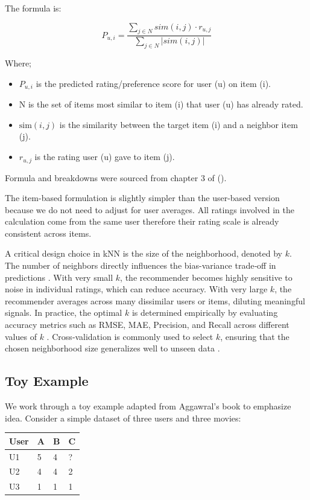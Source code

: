 \documentclass[
  12pt]{article}
\begin{document}
The formula is:

\[
P_{u,i} = \frac{\sum_{j \in N} sim(i,j) \cdot r_{u,j}}{\sum_{j \in N} |sim(i,j)|}
\]

Where;

\begin{itemize}
\item
  \(P_{u,i}\) is the predicted rating/preference score for user (u) on
  item (i).
\item
  N is the set of items most similar to item (i) that user (u) has
  already rated.
\item
  \(\text{sim}(i,j)\) is the similarity between the target item (i) and
  a neighbor item (j).
\item
  \(r_{u,j}\) is the rating user (u) gave to item (j).
\end{itemize}

Formula and breakdowns were sourced from chapter 3 of
(\citet{apxml2025}).

The item-based formulation is slightly simpler than the user-based
version because we do not need to adjust for user averages. All ratings
involved in the calculation come from the same user therefore their
rating scale is already consistent across items.

A critical design choice in kNN is the size of the neighborhood, denoted
by \(k\). The number of neighbors directly influences the bias-variance
trade‑off in predictions \citep{dsm_biasvariance}. With very small
\(k\), the recommender becomes highly sensitive to noise in individual
ratings, which can reduce accuracy. With very large \(k\), the
recommender averages across many dissimilar users or items, diluting
meaningful signals. In practice, the optimal \(k\) is determined
empirically by evaluating accuracy metrics such as RMSE, MAE, Precision,
and Recall across different values of \(k\) \citep{aggarwal2016}.
Cross‑validation is commonly used to select \(k\), ensuring that the
chosen neighborhood size generalizes well to unseen data
\citep{linkedin_knn}.

\subsection{\texorpdfstring{\textbf{Toy
Example}}{Toy Example}}\label{toy-example}

We work through a toy example adapted from Aggawral's book to emphasize
idea. Consider a simple dataset of three users and three movies:

\begin{longtable}[]{@{}llll@{}}
\toprule\noalign{}
User & A & B & C \\
\midrule\noalign{}
\endhead
\bottomrule\noalign{}
\endlastfoot
U1 & 5 & 4 & ? \\
U2 & 4 & 4 & 2 \\
U3 & 1 & 1 & 1 \\
\end{longtable}
\end{document}
